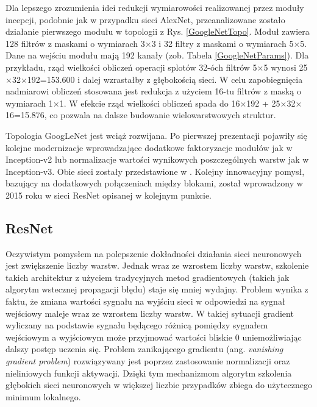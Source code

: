Dla lepszego zrozumienia idei redukcji wymiarowości realizowanej przez moduły incepcji, podobnie jak w przypadku sieci AlexNet, przeanalizowane zostało działanie pierwszego modułu w topologii z Rys. \ref{GoogleNetTopo}.
Moduł zawiera 128 filtrów z maskami o wymiarach 3$\times$3 i 32 filtry z maskami o wymiarach 5$\times$5. Dane na wejściu modułu mają 192 kanały (zob. Tabela \ref{GoogleNetParams}). Dla przykładu, rząd wielkości obliczeń operacji splotów 32-óch filtrów 5$\times$5 wynosi 25$\times$32$\times$192=153.600 i dalej wzrastałby z głębokością sieci. W celu zapobiegnięcia nadmiarowi obliczeń stosowana jest redukcja z użyciem 16-tu filtrów z maską o wymiarach 1$\times$1. W efekcie rząd wielkości obliczeń spada do 16$\times$192 +  25$\times$32$\times$16=15.876, co pozwala na dalsze budowanie wielowarstwowych struktur.

Topologia GoogLeNet jest wciąż rozwijana. Po pierwszej prezentacji pojawiły się kolejne modernizacje wprowadzające dodatkowe faktoryzacje modułów jak w Inception-v2 lub normalizacje wartości wynikowych poszczególnych warstw jak w Inception-v3. Obie sieci zostały przedstawione w \cite{DBLP:journals/corr/SzegedyVISW15}. Kolejny innowacyjny pomysł, bazujący na dodatkowych połączeniach między blokami, został wprowadzony w 2015 roku w sieci ResNet opisanej w kolejnym punkcie.

\subsection{ResNet}
\label{resnet}
Oczywistym pomysłem na polepszenie dokładności działania sieci neuronowych jest zwiększenie liczby warstw. Jednak wraz ze wzrostem liczby warstw, szkolenie takich architektur z użyciem tradycyjnych metod gradientowych (takich jak algorytm wstecznej propagacji błędu) staje się mniej wydajny. Problem wynika z faktu, że zmiana wartości sygnału na wyjściu sieci w odpowiedzi na sygnał wejściowy maleje wraz ze wzrostem liczby warstw. W takiej sytuacji gradient wyliczany na podstawie sygnału będącego różnicą pomiędzy sygnałem wejściowym a wyjściowym może przyjmować wartości bliskie 0 uniemożliwiając dalszy postęp uczenia się. Problem zanikającego gradientu (ang. \textit{vanishing gradient problem}) rozwiązywany jest poprzez zastosowanie normalizacji oraz nieliniowych funkcji aktywacji. Dzięki tym mechanizmom algorytm szkolenia głębokich sieci neuronowych w większej liczbie przypadków zbiega do użytecznego minimum lokalnego. 

